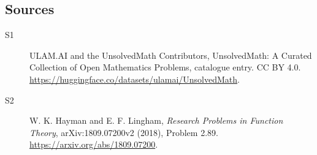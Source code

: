 \documentclass[11pt]{article}
\begin{document}
\subsection{Sources}
\begin{description}
\item[\hypertarget{source:statement:1}{S1}] ULAM.AI and the UnsolvedMath Contributors, UnsolvedMath: A Curated Collection of Open Mathematics Problems, catalogue entry. CC BY 4.0. \url{https://huggingface.co/datasets/ulamai/UnsolvedMath}.
\item[\hypertarget{source:statement:2}{S2}] W. K. Hayman and E. F. Lingham, \emph{Research Problems in Function Theory}, arXiv:1809.07200v2 (2018), Problem 2.89. \url{https://arxiv.org/abs/1809.07200}.
\end{description}
\label{end:statement}
\end{document}
